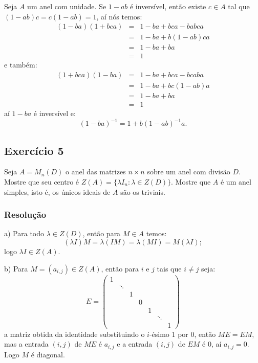 \documentclass[10pt,a4paper]{article}
\begin{document}
Seja $A$ um anel com unidade. Se $1-ab$ é inversível, então existe $c\in A$ tal que $(1-ab)c=c(1-ab)=1$, aí nós temos:
\[
\begin{array}{rcl}
(1-ba)(1+bca)&=&1-ba+bca-babca\\&=&1-ba+b(1-ab)ca\\&=&1-ba+ba\\&=&1
\end{array}
\]
e também:
\[
\begin{array}{rcl}
(1+bca)(1-ba)&=&1-ba+bca-bcaba\\&=&1-ba+bc(1-ab)a\\&=&1-ba+ba\\&=&1
\end{array}
\]
aí $1-ba$ é inversível e:
\[
(1-ba)^{-1}=1+b(1-ab)^{-1}a.
\]

\newpage

\subsection*{Exercício 5}
Seja $A=M_n(D)$ o anel das matrizes $n\times n$ sobre um anel com divisão $D$. Mostre que seu centro é $Z(A)=\{\lambda I_n:\lambda\in Z(D)\}$. Mostre que $A$ é um anel simples, isto é, os únicos ideais de $A$ são os triviais.

\subsubsection*{Resolução}

a) Para todo $\lambda\in Z(D)$, então para $M\in A$ temos:
\[
(\lambda I)M=\lambda(IM)=\lambda(MI)=M(\lambda I);
\]
logo $\lambda I\in Z(A)$.

\noindent
b) Para $M=(a_{i,j})\in Z(A)$, então para $i$ e $j$ tais que $i\neq j$ seja:
\[
E=\begin{pmatrix}
1&&&&&&\\&\ddots&&&&&\\&&1&&&&\\&&&0&&&\\&&&&1&&\\&&&&&\ddots&\\&&&&&&1
\end{pmatrix}
\]
a matriz obtida da identidade substituindo o $i$-ésimo $1$ por $0$, então $ME=EM$, mas a entrada $(i,j)$ de $ME$ é $a_{i,j}$ e a entrada $(i,j)$ de $EM$ é $0$, aí $a_{i,j}=0$. Logo $M$ é diagonal.
\end{document}

